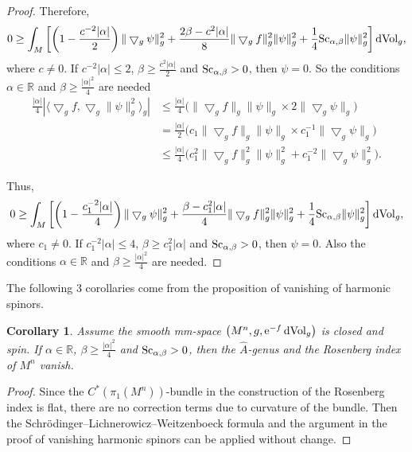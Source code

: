 \documentclass[10pt,a4paper]{amsart}
\newtheorem{Corollary}[Theorem]{Corollary}
\begin{document}
\begin{proof}
Therefore,
\begin{equation*}
0 \geq \int_M \left[\left(1- \frac{c^{-2} |\alpha|}{2}\right)\|\bigtriangledown_g\psi\|^2_g + \frac{2\beta - c^{2} |\alpha|}{8} \|\bigtriangledown_gf\|^2_g\|\psi\|^2_g + \frac{1}{4} {\rm Sc}_{\alpha, \beta} \|\psi\|^2_g \right]  {\rm dVol}_g ,
\end{equation*}
where $c\neq 0$.
If $c^{-2} |\alpha| \leq 2$, $\beta \geq \frac{c^{2} |\alpha|}{2}$ and ${\rm Sc}_{\alpha, \beta} > 0$, then $\psi = 0$. So the conditions $\alpha \in \mathbb{R}$ and $\beta \geq \frac{|\alpha|^2}{4}$ are needed
\begin{align*}
\frac{|\alpha|}{4}|\big\langle\bigtriangledown_gf, \bigtriangledown_g \|\psi\|^2_g \big\rangle_g| &\leq \frac{|\alpha|}{4}\big(\|\bigtriangledown_gf\|_g \|\psi\|_g \times 2 \|\bigtriangledown_g \psi\|_g\big)\\
& = \frac{|\alpha|}{2}\big( c_1 \|\bigtriangledown_gf\|_g\|\psi\|_g \times c_1^{-1} \|\bigtriangledown_g\psi\|_g\big) \\
& \leq \frac{|\alpha|}{4} \big(c_1^2 \|\bigtriangledown_gf\|^2_g \|\psi\|^2_g + c_1^{-2} \|\bigtriangledown_g\psi\|^2_g\big).
 \end{align*}

Thus,
\begin{equation*}
0 \geq \int_M \left[\left(1- \frac{c_1^{-2} |\alpha|}{4}\right)\|\bigtriangledown_g\psi\|^2_g + \frac{\beta - c_1^{2} |\alpha|}{4} \|\bigtriangledown_gf\|^2_g\|\psi\|^2_g + \frac{1}{4} {\rm Sc}_{\alpha, \beta} \|\psi\|^2_g\right]  {\rm dVol}_g ,
\end{equation*}
where $c_1 \neq 0$. If $c_1^{-2} |\alpha| \leq 4$, $\beta \geq c_1^{2} |\alpha|$ and ${\rm Sc}_{\alpha, \beta} > 0$, then $\psi = 0$. Also the conditions $\alpha \in \mathbb{R}$ and $\beta \geq \frac{|\alpha|^2}{4}$ are needed.
\end{proof}

The following 3 corollaries come from the proposition of vanishing of harmonic spinors.

\begin{Corollary}\label{Genus}
Assume the smooth mm-space $\big(M^n, g, {\rm e}^{-f}\,{\rm dVol}_g\big)$ is closed and spin. If $\alpha \in \mathbb{R}$, $\beta \geq \frac{|\alpha|^2}{4}$ and ${\rm Sc}_{\alpha, \beta}>0$, then the $\widehat{A}$-genus and the Rosenberg index of $M^n$ vanish.
\end{Corollary}

\begin{proof}Since the $C^*(\pi_1(M^n))$-bundle in the construction of the Rosenberg index \cite{MR720934} is flat, there are no correction terms due to curvature of the bundle. Then the Schr\"odinger--Lichne\-ro\-wicz--Weitzenboeck formula and the argument in the proof of vanishing harmonic spinors can be applied without change.
\end{proof}
\end{document}
